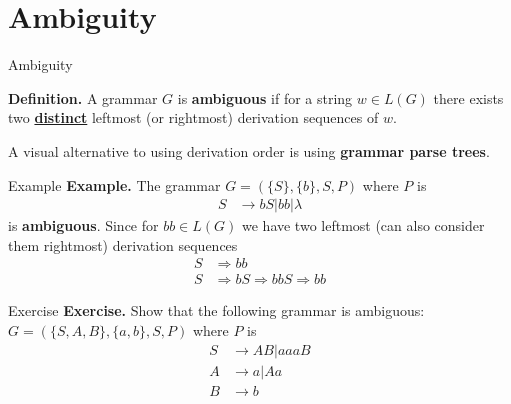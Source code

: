 \documentclass[10pt]{beamer}
\begin{document}
\section{Ambiguity}

\begin{frame}{Ambiguity}

    \textbf{Definition.} A grammar $G$ is \textbf{ambiguous} if for a string $w \in L(G)$ there exists two \textbf{\underline{distinct}} leftmost (or rightmost) derivation sequences of $w$.

    A visual alternative to using derivation order is using \textbf{grammar parse trees}.
\end{frame}

\begin{frame}{Example}
    \textbf{Example.} The grammar $G = (\{S\}, \{b\}, S, P)$ where $P$ is
    \begin{align*}
        S & \rightarrow bS | bb | \lambda
    \end{align*}
    is \textbf{ambiguous}. Since for $bb \in L(G)$ we have two leftmost (can also consider them rightmost) derivation sequences
    \begin{align*}
        S & \Rightarrow bb                                \\
        S & \Rightarrow bS \Rightarrow bbS \Rightarrow bb
    \end{align*}
\end{frame}

\begin{frame}[t]{Exercise}
    \textbf{Exercise.} Show that the following grammar is ambiguous: $G = (\{S, A, B\},  \{a,b\}, S, P)$ where $P$ is
    \begin{align*}
        S & \rightarrow AB|aaaB \\
        A & \rightarrow a|Aa    \\
        B & \rightarrow b
    \end{align*}

\end{frame}
\end{document}
